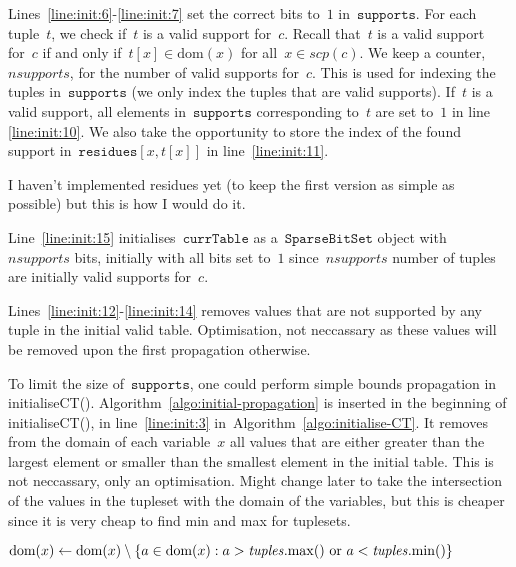 \documentclass[a4paper,11pt]{article}
\newcommand{\Todo}[1]{{\color{blue}#1}}
\newcommand{\Algoref}[1]{Algorithm~\ref{#1}}
\newcommand{\Lineref}[1]{Line~\ref{#1}}
\newcommand{\Linesref}[2]{Lines~\ref{#1}-\ref{#2}}
\newcommand{\Dom}[1]{\text{dom}({#1})}
\newcommand{\SparseBitSet}{\texttt{SparseBitSet}}
\newcommand{\CurrTable}{\texttt{currTable}}
\newcommand{\Supports}{\texttt{supports}}
\newcommand{\Residues}{\texttt{residues}}
\newcommand{\FOREACH}[1]{\WHILE{{#1} \textbf{do}}}
\newcommand{\ENDFOREACH}{\ENDWHILE}
\newcommand{\function}[1]{\mathrm{#1}}
\newcommand{\localvar}[1]{\mathit{#1}}
\numberwithin{equation}{section}
\begin{document}
\Linesref{line:init:6}{line:init:7} set the correct bits to~$1$ in~$\Supports$.
For each tuple~$t$, we check if~$t$ is a valid support for~$c$. Recall that~$t$ is
a valid support for~$c$ if and only if~$t[x] \in \Dom{x}$ for all~$x \in scp(c)$.
We keep a counter,~$nsupports$, for the number of valid supports for~$c$.
This is used for indexing the tuples in~$\Supports$ (we only index the tuples
that are valid supports).
If~$t$ is a valid support,
all elements in~$\Supports$ corresponding to~$t$ are set to~$1$ in
line \ref{line:init:10}. We also take the opportunity to store the index
of the found support in~$\Residues[x,t[x]]$
in line~\ref{line:init:11}.

\Todo{I haven't implemented residues yet (to keep the first version as simple as possible)
but this is how I would do it.}

\Lineref{line:init:15} initialises~$\CurrTable$ as a~$\SparseBitSet$ object with
$nsupports$ bits, initially with all bits set to~$1$ since~$nsupports$
number of tuples are initially valid supports for~$c$.

\Linesref{line:init:12}{line:init:14} removes values that are not supported
by any tuple in the initial valid table. \Todo{Optimisation, not neccassary
as these values will be removed upon the first propagation otherwise.}
 
  To limit the size of~$\Supports$, one could perform simple bounds
  propagation in initialiseCT(). \Algoref{algo:initial-propagation}
  is inserted in the beginning of initialiseCT(), in line~\ref{line:init:3}
  in~\Algoref{algo:initialise-CT}. It removes
  from the domain of each variable~$x$ all values that are either greater 
  than the largest element or smaller than the smallest element in the
  initial table. \Todo{This is not neccassary, only an optimisation.
  Might change later to take the intersection of the 
  values in the tupleset with the domain of the variables, but this is cheaper
  since it is very cheap to find min and max for tuplesets.}

\begin{algorithm}[H]
  \begin{algorithmic}[1]  %
    \FOREACH{$x \in \localvar{variables}$} %
        \STATE $\Dom{x} \leftarrow \Dom{x} \setminus  
        \Set{a \in \Dom{x} : a > \localvar{tuples}.\function{max}()
          ~\text{or}~a < \localvar{tuples}.\function{min}()}$
      \ENDFOREACH
  \end{algorithmic}
  \caption{Simple initial propagation for keeping down the size of \Supports,
  to be inserted in the beginning of initialiseCT() in~\Algoref{algo:initialise-CT}.}
  \label{algo:initial-propagation}
\end{algorithm}
\end{document}
